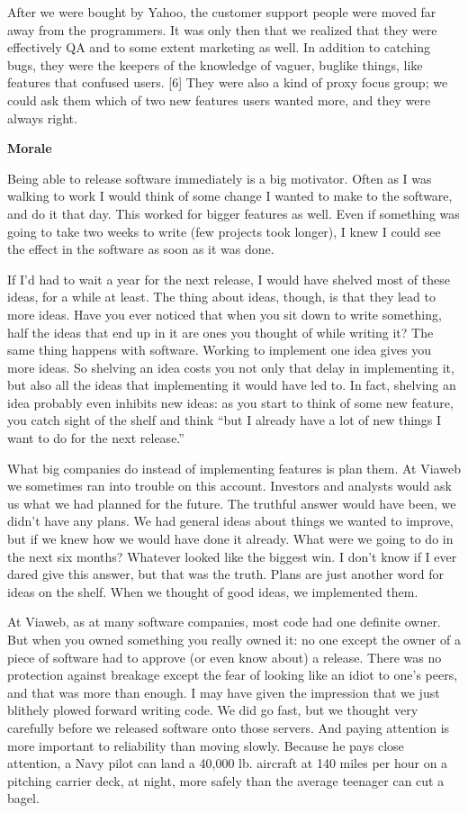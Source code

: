 After we were bought by Yahoo, the customer support people were moved
far away from the programmers. It was only then that we realized that
they were effectively QA and to some extent marketing as well. In
addition to catching bugs, they were the keepers of the knowledge of
vaguer, buglike things, like features that confused users. {[}6{]} They
were also a kind of proxy focus group; we could ask them which of two
new features users wanted more, and they were always right.

\textbf{Morale}

Being able to release software immediately is a big motivator. Often as
I was walking to work I would think of some change I wanted to make to
the software, and do it that day. This worked for bigger features as
well. Even if something was going to take two weeks to write (few
projects took longer), I knew I could see the effect in the software as
soon as it was done.

If I'd had to wait a year for the next release, I would have shelved
most of these ideas, for a while at least. The thing about ideas,
though, is that they lead to more ideas. Have you ever noticed that when
you sit down to write something, half the ideas that end up in it are
ones you thought of while writing it? The same thing happens with
software. Working to implement one idea gives you more ideas. So
shelving an idea costs you not only that delay in implementing it, but
also all the ideas that implementing it would have led to. In fact,
shelving an idea probably even inhibits new ideas: as you start to think
of some new feature, you catch sight of the shelf and think ``but I
already have a lot of new things I want to do for the next release.''

What big companies do instead of implementing features is plan them. At
Viaweb we sometimes ran into trouble on this account. Investors and
analysts would ask us what we had planned for the future. The truthful
answer would have been, we didn't have any plans. We had general ideas
about things we wanted to improve, but if we knew how we would have done
it already. What were we going to do in the next six months? Whatever
looked like the biggest win. I don't know if I ever dared give this
answer, but that was the truth. Plans are just another word for ideas on
the shelf. When we thought of good ideas, we implemented them.

At Viaweb, as at many software companies, most code had one definite
owner. But when you owned something you really owned it: no one except
the owner of a piece of software had to approve (or even know about) a
release. There was no protection against breakage except the fear of
looking like an idiot to one's peers, and that was more than enough. I
may have given the impression that we just blithely plowed forward
writing code. We did go fast, but we thought very carefully before we
released software onto those servers. And paying attention is more
important to reliability than moving slowly. Because he pays close
attention, a Navy pilot can land a 40,000 lb. aircraft at 140 miles per
hour on a pitching carrier deck, at night, more safely than the average
teenager can cut a bagel.

